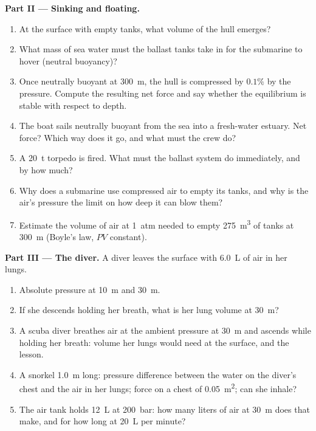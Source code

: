 \begin{problem}
\medskip
\noindent\textbf{Part II --- Sinking and floating.}
\begin{enumerate}[resume]
  \item At the surface with empty tanks, what volume of the hull emerges?
  \item What mass of sea water must the ballast tanks take in for the
        submarine to hover (neutral buoyancy)?
  \item Once neutrally buoyant at \qty{300}{m}, the hull is compressed by
        $0.1\%$ by the pressure. Compute the resulting net force and say
        whether the equilibrium is stable with respect to depth.
  \item The boat sails neutrally buoyant from the sea into a fresh-water
        estuary. Net force? Which way does it go, and what must the crew
        do?
  \item A \qty{20}{t} torpedo is fired. What must the ballast system do
        immediately, and by how much?
  \item Why does a submarine use compressed air to empty its tanks, and
        why is the air's pressure the limit on how deep it can blow them?
  \item Estimate the volume of air at \qty{1}{atm} needed to empty
        \qty{275}{m^3} of tanks at \qty{300}{m} (Boyle's law, $PV$
        constant).
\end{enumerate}

\medskip
\noindent\textbf{Part III --- The diver.}
A diver leaves the surface with \qty{6.0}{L} of air in her lungs.
\begin{enumerate}[resume]
  \item Absolute pressure at \qty{10}{m} and \qty{30}{m}.
  \item If she descends holding her breath, what is her lung volume at
        \qty{30}{m}?
  \item A scuba diver breathes air at the ambient pressure at \qty{30}{m}
        and ascends while holding her breath: volume her lungs would
        need at the surface, and the lesson.
  \item A snorkel \qty{1.0}{m} long: pressure difference between the
        water on the diver's chest and the air in her lungs; force on a
        chest of \qty{0.05}{m^2}; can she inhale?
  \item The air tank holds \qty{12}{L} at \qty{200}{bar}: how many liters
        of air at \qty{30}{m} does that make, and for how long at
        \qty{20}{L} per minute?
\end{enumerate}


\end{problem}
